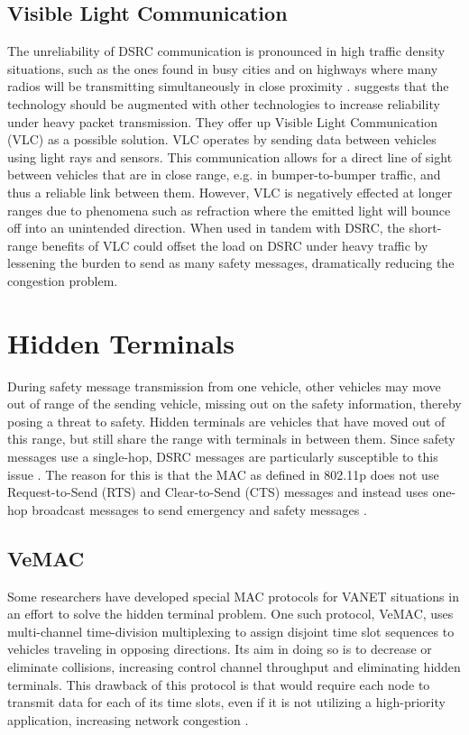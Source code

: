 \documentclass[twoside,conference]{IEEEtran}
\begin{document}
	\subsection{Visible Light Communication}\label{sec:visiblelightcommunication}
		The unreliability of DSRC communication is pronounced in high traffic density situations, such as the ones found in busy cities and on highways where many radios will be transmitting simultaneously in close proximity \cite{Cailean2014}. \cite{Cailean2014} suggests that the technology should be augmented with other technologies to increase reliability under heavy packet transmission. They offer up Visible Light Communication (VLC) as a possible solution. VLC operates by sending data between vehicles using light rays and sensors. This communication allows for a direct line of sight between vehicles that are in close range, e.g. in bumper-to-bumper traffic, and thus a reliable link between them. However, VLC is negatively effected at longer ranges due to phenomena such as refraction where the emitted light will bounce off into an unintended direction. When used in tandem with DSRC, the short-range benefits of VLC could offset the load on DSRC under heavy traffic by lessening the burden to send as many safety messages, dramatically reducing the congestion problem.

\section{Hidden Terminals}\label{sec:hiddenterminal}
		During safety message transmission from one vehicle, other vehicles may move out of range of the sending vehicle, missing out on the safety information, thereby posing a threat to safety. Hidden terminals are vehicles that have moved out of this range, but still share the range with terminals in between them. Since safety messages use a single-hop, DSRC messages are particularly susceptible to this issue \cite{Ma2009}.  The reason for this is that the MAC as defined in 802.11p does not use Request-to-Send (RTS) and Clear-to-Send (CTS) messages and instead uses one-hop broadcast messages to send emergency and safety messages \cite[p. 969]{Rahman2014}. 
		
		\subsection{VeMAC}\label{sec:vemac}
			Some researchers have developed special MAC protocols for VANET situations in an effort to solve the hidden terminal problem. One such protocol, VeMAC, uses multi-channel time-division multiplexing to assign disjoint time slot sequences to vehicles traveling in opposing directions. Its aim in doing so is to decrease or eliminate collisions, increasing control channel throughput and eliminating hidden terminals\cite{Omar2013}. This drawback of this protocol is that would require each node to transmit data for each of its time slots, even if it is not utilizing a high-priority application, increasing network congestion \cite{Kolte2014}. 
		
\end{document}
